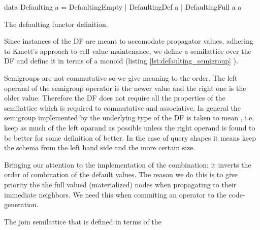 \begin{code}
  \begin{haskellcode}
    data Defaulting a =
      DefaultingEmpty
      | DefaultingDef a
      | DefaultingFull a a
  \end{haskellcode}
  \label{lst:defaulting_functor}
  \caption{The defaulting functor definition.}
\end{code}

Since instances of the DF are meant to accomodate propagator values,
adhering to Kmett's approach to cell value maintenance, we define a
semilattice over the DF and define it in terms of a monoid (listing
\ref{lst:defaulting_semigroup} ).

Semigroups are not commutative so we give meaning to the order. The
left operand of the semigroup operator is the newer value and the
right one is the older value. Therefore the DF does not require all
the properties of the semilattice which is required to commutative and
associative. In general the semigroup implemented by the underlying
type of the DF is taken to mean , i.e. keep as
much of the left oparand as possible unless the right operand is found
to be better for some definition of better. In the case of query
shapes it means keep the schema from the left hand side and the more
certain size.

Bringing our attention to the implementation of the 
combination: it inverts the order of combination of the default
values. The reason we do this is to give priority the the full valued
(materialized) nodes when propagating to their immediate neighbors. We
need this when commiting an operator to the code-generation.

\begin{code}
  \label{lst:defaulting_semigroup}
  \caption{The join semilattice that is defined in terms of the}
\end{code}

